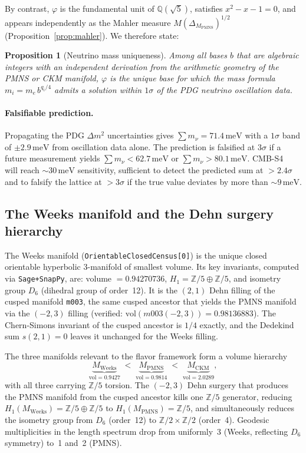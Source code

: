 ﻿\documentclass[12pt]{article}
\newtheorem{proposition}[theorem]{Proposition}
\theoremstyle{definition}
\begin{document}
By contrast, $\varphi$ is the fundamental unit of $\mathbb{Q}(\sqrt{5})$,
satisfies $x^2-x-1=0$, and appears independently as the Mahler measure
$M(\Delta_{M_\text{PMNS}})^{1/2}$ (Proposition~\ref{prop:mahler}).
We therefore state:

\begin{proposition}[Neutrino mass uniqueness]
\label{prop:neutrino}
Among all bases $b$ that are algebraic integers with an independent
derivation from the arithmetic geometry of the PMNS or CKM manifold,
$\varphi$ is the unique base for which the mass formula
$m_i = m_e\,b^{q_i/4}$ admits a solution within $1\sigma$ of the
PDG neutrino oscillation data.
\end{proposition}

\paragraph{Falsifiable prediction.}
Propagating the PDG $\Delta m^2$ uncertainties gives
$\sum m_\nu = 71.4\,\text{meV}$ with a $1\sigma$ band of
$\pm 2.9\,\text{meV}$ from oscillation data alone.  The prediction is
falsified at $3\sigma$ if a future measurement yields
$\sum m_\nu < 62.7\,\text{meV}$ or $\sum m_\nu > 80.1\,\text{meV}$.
CMB-S4~\cite{CMBS4} will reach $\sim30\,\text{meV}$ sensitivity,
sufficient to detect the predicted sum at $>2.4\sigma$ and to
falsify the lattice at $>3\sigma$ if the true value deviates
by more than $\sim9\,\text{meV}$.


\subsection{The Weeks manifold and the Dehn surgery hierarchy}
\label{subsec:weeks}

The Weeks manifold (\texttt{OrientableClosedCensus[0]}) is the unique
closed orientable hyperbolic 3-manifold of smallest volume.
Its key invariants, computed via \texttt{Sage+SnapPy}, are:
volume $= 0.94270736$, $H_1 = \mathbb{Z}/5 \oplus \mathbb{Z}/5$,
and isometry group $D_6$ (dihedral group of order~12).
It is the $(2,1)$ Dehn filling of the cusped manifold \texttt{m003},
the same cusped ancestor that yields the PMNS manifold via the $(-2,3)$
filling (verified: $\mathrm{vol}(m003(-2,3)) = 0.98136883$).
The Chern-Simons invariant of the cusped ancestor is $1/4$ exactly,
and the Dedekind sum $s(2,1)=0$ leaves it unchanged for the Weeks filling.

The three manifolds relevant to the flavor framework form a
volume hierarchy
\[
\underbrace{M_{\mathrm{Weeks}}}_{\mathrm{vol}=0.9427}
\;<\;
\underbrace{M_{\mathrm{PMNS}}}_{\mathrm{vol}=0.9814}
\;<\;
\underbrace{M_{\mathrm{CKM}}}_{\mathrm{vol}=2.0289},
\]
with all three carrying $\mathbb{Z}/5$ torsion.
The $(-2,3)$ Dehn surgery that produces the PMNS manifold from the
cusped ancestor kills one $\mathbb{Z}/5$ generator, reducing
$H_1(M_{\mathrm{Weeks}}) = \mathbb{Z}/5 \oplus \mathbb{Z}/5$ to
$H_1(M_{\mathrm{PMNS}}) = \mathbb{Z}/5$,
and simultaneously reduces the isometry group from $D_6$ (order~12)
to $\mathbb{Z}/2 \times \mathbb{Z}/2$ (order~4).
Geodesic multiplicities in the length spectrum drop from uniformly~3
(Weeks, reflecting $D_6$ symmetry) to~1 and~2 (PMNS).
\end{document}

